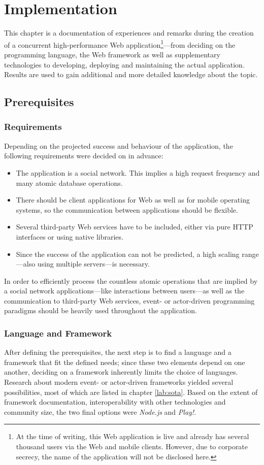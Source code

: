 \chapter{Implementation}
\label{sec:impl}
This chapter is a documentation of experiences and remarks during the creation of a concurrent high-performance Web application\footnote{At the time of writing, this Web application is live and already has several thousand users via the Web and mobile clients. However, due to corporate secrecy, the name of the application will not be disclosed here.}---from deciding on the programming language, the Web framework as well as supplementary technologies to developing, deploying and maintaining the actual application. Results are used to gain additional and more detailed knowledge about the topic.

\section{Prerequisites}
\label{sec:prerequitites}
\subsection{Requirements}
Depending on the projected success and behaviour of the application, the following requirements were decided on in advance:

\begin{itemize}
  \item{The application is a social network. This implies a high request frequency and many atomic database operations.}
  \item{There should be client applications for Web as well as for mobile operating systems, so the communication between applications should be flexible.}
  \item{Several third-party Web services have to be included, either via pure HTTP interfaces or using native libraries.}
  \item{Since the success of the application can not be predicted, a high scaling range---also using multiple servers---is necessary.}
\end{itemize}

In order to efficiently process the countless atomic operations that are implied by a social network applications---like interactions between users---as well as the communication to third-party Web services, event- or actor-driven programming paradigms should be heavily used throughout the application.

\subsection{Language and Framework}
\label{lab:lang}
After defining the prerequisites, the next step is to find a language and a framework that fit the defined needs; since these two elements depend on one another, deciding on a framework inherently limits the choice of languages. Research about modern event- or actor-driven frameworks yielded several possibilities, most of which are listed in chapter \ref{lab:sota}. Based on the extent of framework documentation, interoperability with other technologies and community size, the two final options were \textit{Node.js} and \textit{Play!}. 

